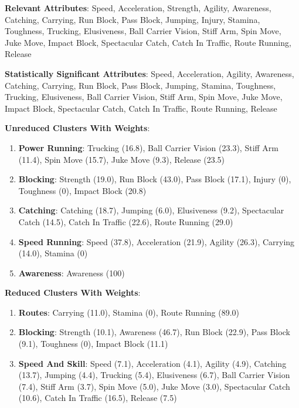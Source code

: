 \documentclass[11pt]{article}
\begin{document}
\textbf{Relevant Attributes}: Speed, Acceleration, Strength, Agility, Awareness, Catching, Carrying, Run Block, Pass Block, Jumping, Injury, Stamina, Toughness, Trucking, Elusiveness, Ball Carrier Vision, Stiff Arm, Spin Move, Juke Move, Impact Block, Spectacular Catch, Catch In Traffic, Route Running, Release

\textbf{Statistically Significant Attributes}: Speed, Acceleration, Agility, Awareness, Catching, Carrying, Run Block, Pass Block, Jumping, Stamina, Toughness, Trucking, Elusiveness, Ball Carrier Vision, Stiff Arm, Spin Move, Juke Move, Impact Block, Spectacular Catch, Catch In Traffic, Route Running, Release

\textbf{Unreduced Clusters With Weights}:

\begin{enumerate}
\item{\textbf{Power Running}}: Trucking (16.8), Ball Carrier Vision (23.3), Stiff Arm (11.4), Spin Move (15.7), Juke Move (9.3), Release (23.5)
\item{\textbf{Blocking}}: Strength (19.0), Run Block (43.0), Pass Block (17.1), Injury (0), Toughness (0), Impact Block (20.8)
\item{\textbf{Catching}}: Catching (18.7), Jumping (6.0), Elusiveness (9.2), Spectacular Catch (14.5), Catch In Traffic (22.6), Route Running (29.0)
\item{\textbf{Speed Running}}: Speed (37.8), Acceleration (21.9), Agility (26.3), Carrying (14.0), Stamina (0)
\item{\textbf{Awareness}}: Awareness (100) 

\end{enumerate}

\textbf{Reduced Clusters With Weights}:

\begin{enumerate}
\item{\textbf{Routes}}: Carrying (11.0), Stamina (0), Route Running (89.0)
\item{\textbf{Blocking}}: Strength (10.1), Awareness (46.7), Run Block (22.9), Pass Block (9.1), Toughness (0), Impact Block (11.1)
\item{\textbf{Speed And Skill}}: Speed (7.1), Acceleration (4.1), Agility (4.9), Catching (13.7), Jumping (4.4), Trucking (5.4), Elusiveness (6.7), Ball Carrier Vision (7.4), Stiff Arm (3.7), Spin Move (5.0), Juke Move (3.0), Spectacular Catch (10.6), Catch In Traffic (16.5), Release (7.5)

\end{enumerate}
\end{document}
